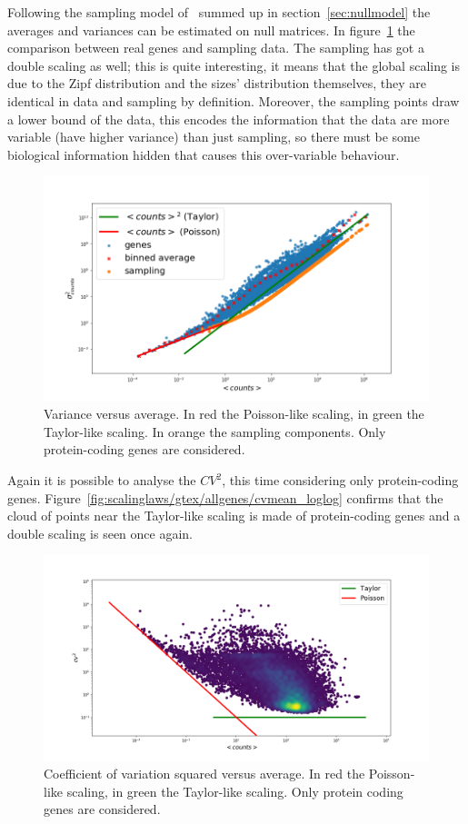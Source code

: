Following the sampling model of~\cite{Mazzolini2018} summed up in section~\ref{sec:nullmodel} the averages and variances can be estimated on null matrices. In figure~\ref{fig:scalinglaws/gtex/varmean_3sigma} the comparison between real genes and sampling data. The sampling has got a double scaling as well; this is quite interesting, it means that the global scaling is due to the Zipf distribution and the sizes' distribution themselves, they are identical in data and sampling by definition.
Moreover, the sampling points draw a lower bound of the data, this encodes the information that the data are more variable (have higher variance) than just sampling, so there must be some biological information hidden that causes this over-variable behaviour.
\begin{figure}[H]
    \centering
    \includegraphics[width=0.8\linewidth]{pictures/scalinglaws/gtex/varmean_3sigma.png}
    \caption{Variance versus average. In \textcolor{pythonred}{red} the Poisson-like scaling, in \textcolor{pythongreen}{green} the Taylor-like scaling. In \textcolor{pythonorange}{orange} the sampling components. Only protein-coding genes are considered.}
    \label{fig:scalinglaws/gtex/varmean_3sigma}
\end{figure}

Again it is possible to analyse the $CV^2$, this time considering only protein-coding genes. Figure~\ref{fig:scalinglaws/gtex/allgenes/cvmean_loglog} confirms that the cloud of points near the Taylor-like scaling is made of protein-coding genes and a double scaling is seen once again.
\begin{figure}[htb!]
    \centering
    \includegraphics[width=0.9\linewidth]{pictures/scalinglaws/gtex/cvmean_loglog_density.png}
    \caption{Coefficient of variation squared versus average. In \textcolor{pythonred}{red} the Poisson-like scaling, in \textcolor{pythongreen}{green} the Taylor-like scaling. Only protein coding genes are considered.}
    \label{fig:scalinglaws/gtex/cvmean_loglog}
\end{figure}

